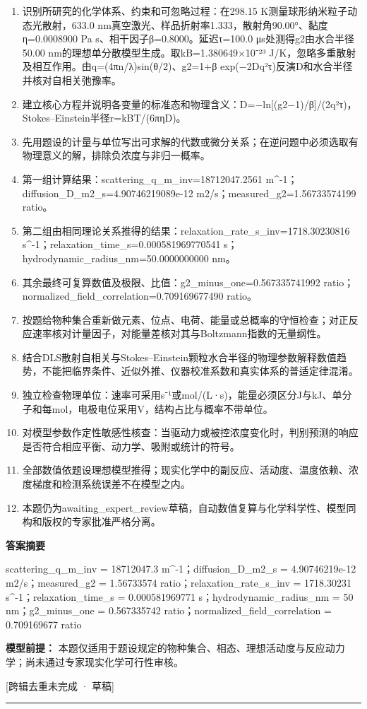 \documentclass[UTF8,11pt,a4paper]{ctexart}
\begin{document}
\begin{enumerate}
\item 识别所研究的化学体系、约束和可忽略过程：在298.15 K测量球形纳米粒子动态光散射，633.0 nm真空激光、样品折射率1.333，散射角90.00°、黏度η=0.0008900 Pa s、相干因子β=0.8000。延迟τ=100.0 μs处测得g2由水合半径50.00 nm的理想单分散模型生成。取kB=1.380649×10⁻²³ J/K，忽略多重散射及相互作用。由q=(4πn/λ)sin(θ/2)、g2=1+β exp(−2Dq²τ)反演D和水合半径并核对自相关弛豫率。
\item 建立核心方程并说明各变量的标准态和物理含义：D=−ln[(g2−1)/β]/(2q²τ)，Stokes–Einstein半径r=kBT/(6πηD)。
\item 先用题设的计量与单位写出可求解的代数或微分关系；在逆问题中必须选取有物理意义的解，排除负浓度与非归一概率。
\item 第一组计算结果：scattering\_q\_m\_inv=18712047.2561 m\textasciicircum{}-1；diffusion\_D\_m2\_s=4.90746219089e-12 m2/s；measured\_g2=1.56733574199 ratio。
\item 第二组由相同理论关系推得的结果：relaxation\_rate\_s\_inv=1718.30230816 s\textasciicircum{}-1；relaxation\_time\_s=0.000581969770541 s；hydrodynamic\_radius\_nm=50.0000000000 nm。
\item 其余最终可复算数值及极限、比值：g2\_minus\_one=0.567335741992 ratio；normalized\_field\_correlation=0.709169677490 ratio。
\item 按题给物种集合重新做元素、位点、电荷、能量或总概率的守恒检查；对正反应速率核对计量因子，对能量差核对其与Boltzmann指数的无量纲性。
\item 结合DLS散射自相关与Stokes–Einstein颗粒水合半径的物理参数解释数值趋势，不能把临界条件、近似外推、仪器校准系数和真实体系的普适定律混淆。
\item 独立检查物理单位：速率可采用s⁻¹或mol/(L·s)，能量必须区分J与kJ、单分子和每mol，电极电位采用V，结构占比与概率不带单位。
\item 对模型参数作定性敏感性核查：当驱动力或被控浓度变化时，判别预测的响应是否符合相应平衡、动力学、吸附或统计的符号。
\item 全部数值依题设理想模型推得；现实化学中的副反应、活动度、温度依赖、浓度梯度和检测系统误差不在模型之内。
\item 本题仍为awaiting\_expert\_review草稿，自动数值复算与化学科学性、模型同构和版权的专家批准严格分离。
\end{enumerate}
\noindent\textbf{答案摘要}\par
scattering\_q\_m\_inv = 18712047.3 m\textasciicircum{}-1；diffusion\_D\_m2\_s = 4.90746219e-12 m2/s；measured\_g2 = 1.56733574 ratio；relaxation\_rate\_s\_inv = 1718.30231 s\textasciicircum{}-1；relaxation\_time\_s = 0.000581969771 s；hydrodynamic\_radius\_nm = 50 nm；g2\_minus\_one = 0.567335742 ratio；normalized\_field\_correlation = 0.709169677 ratio\par
\noindent\textbf{模型前提：}
本题仅适用于题设规定的物种集合、相态、理想活动度与反应动力学；尚未通过专家现实化学可行性审核。\par
\noindent\textcolor{red!65!black}{[跨辑去重未完成 · 草稿]} \par
\medskip\hrule\medskip
{}
\end{document}
